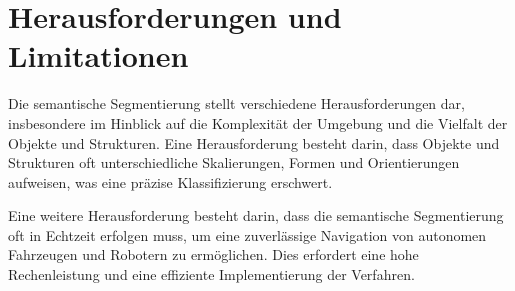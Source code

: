 \section{Herausforderungen und Limitationen}
Die semantische Segmentierung stellt verschiedene Herausforderungen dar,
insbesondere im Hinblick auf die Komplexität der Umgebung und die Vielfalt der
Objekte und Strukturen. Eine Herausforderung besteht darin, dass Objekte und
Strukturen oft unterschiedliche Skalierungen, Formen und Orientierungen
aufweisen, was eine präzise Klassifizierung erschwert.

Eine weitere Herausforderung besteht darin, dass die semantische Segmentierung
oft in Echtzeit erfolgen muss, um eine zuverlässige Navigation von autonomen
Fahrzeugen und Robotern zu ermöglichen. Dies erfordert eine hohe Rechenleistung
und eine effiziente Implementierung der Verfahren.